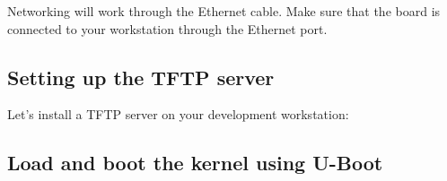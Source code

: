 Networking will work through the Ethernet cable. Make sure that the
board is connected to your workstation through the Ethernet port.


\subsection{Setting up the TFTP server}

Let's install a TFTP server on your development workstation:








\subsection{Load and boot the kernel using U-Boot}


